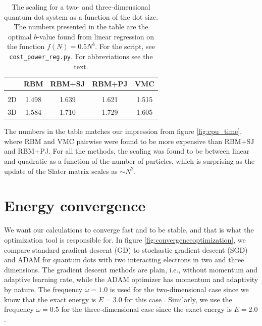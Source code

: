 \begin{table}
	\caption{The scaling for a two- and three-dimensional quantum dot system as a function of the dot size. The numbers presented in the table are the optimal $b$-value found from linear regression on the function $f(N)=0.5N^b$. For the script, see \lstinline|cost_power_reg.py|. For abbreviations see the text.}
	\begin{tabularx}{\textwidth}{CCCCC} \hline\hline
		\label{tab:cputimefit}
		\makecell{\\ \phantom{=}} & RBM & RBM+SJ & RBM+PJ & VMC \\ \hline \\
		2D & 1.498 & 1.639 & 1.621 & 1.515 \\ 
		3D & 1.584 & 1.710 & 1.729 & 1.605 \\ \hline\hline
	\end{tabularx}
\end{table}

The numbers in the table matches our impression from figure \eqref{fig:cpu_time}, where RBM and VMC pairwise were found to be more expensive than RBM+SJ and RBM+PJ. For all the methods, the scaling was found to be between linear and quadratic as a function of the number of particles, which is surprising as the update of the Slater matrix scales as $\sim N^2$. 

\newpage
\section{Energy convergence}
We want our calculations to converge fast and to be stable, and that is what the optimization tool is responsible for. In figure \eqref{fig:convergenceoptimization}, we compare standard gradient descent (GD) to stochastic gradient descent (SGD) and ADAM for quantum dots with two interacting electrons in two and three dimensions. The gradient descent methods are plain, i.e., without momentum and adaptive learning rate, while the ADAM optimizer has momentum and adaptivity by nature. The frequency $\omega=1.0$ is used for the two-dimensional case since we know that the exact energy is $E=3.0$ for this case \cite{taut_two_1993}. Similarly, we use the frequency $\omega=0.5$ for the three-dimensional case since the exact energy is $E=2.0$ \cite{taut_two_1994}. 

